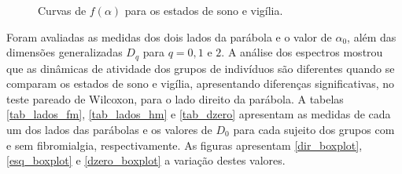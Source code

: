 \documentclass{ufscThesis}
\begin{document}
\begin{figure}[!h]
\center
{}
\quad
{}
\caption{Curvas de $f(\alpha)$ para os estados de sono e vigília.}
\label{ch_all}
\end{figure}

Foram avaliadas as medidas dos dois lados da parábola e o valor de $\alpha_{0}$, além das dimensões generalizadas $D_{q}$ para $q=0, 1$ e $2$.
A análise dos espectros mostrou que as dinâmicas de atividade dos grupos de indivíduos são diferentes quando se comparam os estados de sono e vigília, apresentando diferenças significativas, no teste pareado de Wilcoxon, para o lado direito da parábola. A tabelas \ref{tab_lados_fm}, \ref{tab_lados_hm} e \ref{tab_dzero} apresentam as medidas de cada um dos lados das parábolas e os valores de $D_{0}$ para cada sujeito dos grupos com e sem fibromialgia, respectivamente. As figuras apresentam \ref{dir_boxplot}, \ref{esq_boxplot} e \ref{dzero_boxplot} a variação destes valores.
\end{document}
